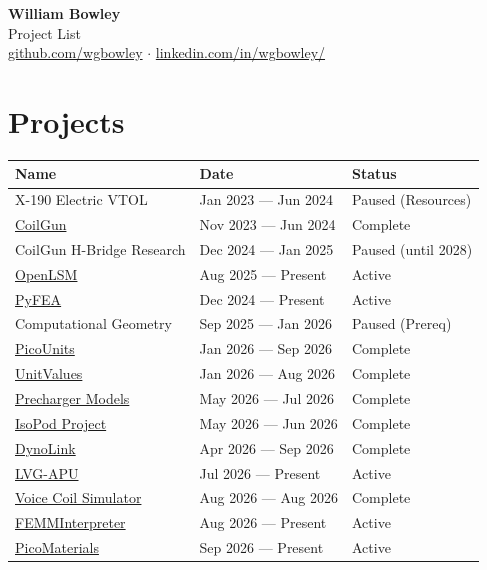 \documentclass[11pt,a4paper]{article}
\begin{document}
\begin{center}
{\LARGE \textbf{William Bowley}} \\[4pt]
{\large Project List} \\[2pt]
\href{https://github.com/wgbowley}{github.com/wgbowley} \quad $\cdot$ \quad
\href{https://linkedin.com/in/wgbowley}{linkedin.com/in/wgbowley/}
\end{center}

\section*{Projects}

\begin{table}[h]
  \centering
  \renewcommand{\arraystretch}{1.5}
  \begin{tabular}{>{\raggedright\arraybackslash}p{5.5cm} 
                  >{\raggedright\arraybackslash}p{4cm}
                  >{\raggedright\arraybackslash}p{3.5cm}}
    \toprule
    \textbf{Name} & \textbf{Date} & \textbf{Status} \\
    \midrule
    X-190 Electric VTOL & Jan 2023 --- Jun 2024 & Paused (Resources) \\
    \href{https://github.com/wgbowley/CoilGun}{CoilGun} & Nov 2023 --- Jun 2024 & Complete \\
    CoilGun H-Bridge Research & Dec 2024 --- Jan 2025 & Paused (until 2028) \\
    \href{https://github.com/wgbowley/openLSM}{OpenLSM} & Aug 2025 --- Present & Active \\
    \href{https://github.com/Bowley-Systems/PyFEA}{PyFEA} & Dec 2024 --- Present & Active \\
    Computational Geometry & Sep 2025 --- Jan 2026 & Paused (Prereq) \\ 
    \href{https://github.com/Bowley-Systems/PicoUnits}{PicoUnits} & Jan 2026 --- Sep 2026 & Complete \\
    \href{https://github.com/Bowley-Systems/UnitValues}{UnitValues} & Jan 2026 --- Aug 2026 & Complete \\
    \href{https://github.com/rmit-wgbowley/Precharger}{Precharger Models} & May 2026 --- Jul 2026 & Complete \\ 
    \href{https://github.com/rmit-wgbowley/Isopod}{IsoPod Project} & May 2026 --- Jun 2026 & Complete \\
    \href{https://github.com/rmit-wgbowley/DynoLink}{DynoLink} & Apr 2026 --- Sep 2026 & Complete \\
    \href{https://github.com/rmit-wgbowley/APU}{LVG-APU} & Jul 2026 --- Present & Active \\
    \href{https://github.com/Ti-g/electro-actuator-sim}{Voice Coil Simulator} & Aug 2026 --- Aug 2026 & Complete \\
    \href{https://github.com/wgbowley/FEMMInterpreter}{FEMMInterpreter} & Aug 2026 --- Present & Active \\
    \href{https://github.com/Bowley-Systems/PicoMats}{PicoMaterials} & Sep 2026 --- Present & Active \\
    \bottomrule
  \end{tabular}
\end{table}
\end{document}
